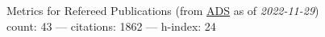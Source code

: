 Metrics for Refereed Publications (from \href{\adsurl}{ADS} as of \textit{2022-11-29}) \\count: 43 --- citations: 1862 --- h-index: 24